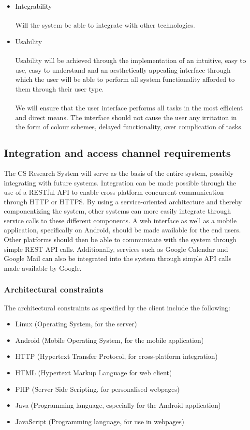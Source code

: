 \documentclass[a4paper]{article}
\begin{document}
\begin{itemize}
		
		\item Integrability \\\\
		Will the system be able to integrate with other technologies.
		\item Usability \\\\
		Usability will be achieved through the implementation of an intuitive, easy to use, easy to understand and an aesthetically appealing interface through which the user will be able to perform all system functionality afforded to them through their user type.
		\\\\
		We will ensure that the user interface performs all tasks in the most efficient and direct means. The interface should not cause the user any irritation in the form of colour schemes, delayed functionality, over complication of tasks.
	\end{itemize}
	
	
	\subsection{Integration and access channel requirements}
	The CS Research System will serve as the basis of the entire system, possibly integrating with future systems. Integration can be made possible through the use of a RESTful API to enable cross-platform concurrent communication through HTTP or HTTPS. By using a service-oriented architecture and thereby componentizing the system, other systems can more easily integrate through service calls to these different components. A web interface as well as a mobile application, specifically on Android, should be made available for the end users. Other platforms should then be able to communicate with the system through simple REST API calls. Additionally, services such as Google Calendar and Google Mail can also be integrated into the system through simple API calls made available by Google. 
	\\
	
	\subsubsection{Architectural constraints}
	The architectural constraints as specified by the client include the following:
	\begin{itemize}
		\item Linux (Operating System, for the server)
		\item Android (Mobile Operating System, for the mobile application)
		\item HTTP (Hypertext Transfer Protocol, for cross-platform integration)
		\item HTML (Hypertext Markup Language for web client)
		\item PHP (Server Side Scripting, for personalised webpages)
		\item Java (Programming language, especially for the Android application)
		\item JavaScript (Programming language, for use in webpages)
	\end{itemize}
	\\
	
\end{document}

